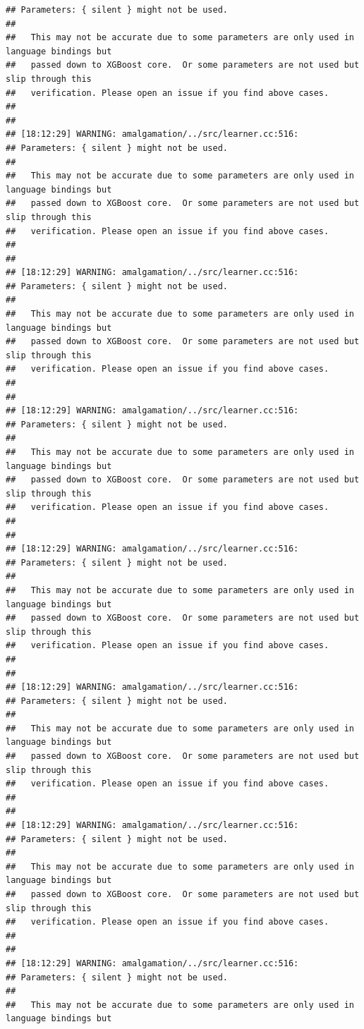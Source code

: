 \documentclass[AMS,STIX2COL]{WileyNJD-v2}\usepackage[]{graphicx}\usepackage[]{color}
\makeatletter
\newenvironment{kframe}{%
 \def\at@end@of@kframe{}%
 \ifinner\ifhmode%
  \def\at@end@of@kframe{\end{minipage}}%
  \begin{minipage}{\columnwidth}%
 \fi\fi%
 \def\FrameCommand##1{\hskip\@totalleftmargin \hskip-\fboxsep
 \colorbox{shadecolor}{##1}\hskip-\fboxsep
     \hskip-\linewidth \hskip-\@totalleftmargin \hskip\columnwidth}%
 \MakeFramed {\advance\hsize-\width
   \@totalleftmargin\z@ \linewidth\hsize
   \@setminipage}}%
 {\par\unskip\endMakeFramed%
 \at@end@of@kframe}
\newenvironment{knitrout}{}{} %
\makeatother
\begin{document}
\begin{knitrout}
\begin{kframe}
\begin{verbatim}
## Parameters: { silent } might not be used.
## 
##   This may not be accurate due to some parameters are only used in language bindings but
##   passed down to XGBoost core.  Or some parameters are not used but slip through this
##   verification. Please open an issue if you find above cases.
## 
## 
## [18:12:29] WARNING: amalgamation/../src/learner.cc:516: 
## Parameters: { silent } might not be used.
## 
##   This may not be accurate due to some parameters are only used in language bindings but
##   passed down to XGBoost core.  Or some parameters are not used but slip through this
##   verification. Please open an issue if you find above cases.
## 
## 
## [18:12:29] WARNING: amalgamation/../src/learner.cc:516: 
## Parameters: { silent } might not be used.
## 
##   This may not be accurate due to some parameters are only used in language bindings but
##   passed down to XGBoost core.  Or some parameters are not used but slip through this
##   verification. Please open an issue if you find above cases.
## 
## 
## [18:12:29] WARNING: amalgamation/../src/learner.cc:516: 
## Parameters: { silent } might not be used.
## 
##   This may not be accurate due to some parameters are only used in language bindings but
##   passed down to XGBoost core.  Or some parameters are not used but slip through this
##   verification. Please open an issue if you find above cases.
## 
## 
## [18:12:29] WARNING: amalgamation/../src/learner.cc:516: 
## Parameters: { silent } might not be used.
## 
##   This may not be accurate due to some parameters are only used in language bindings but
##   passed down to XGBoost core.  Or some parameters are not used but slip through this
##   verification. Please open an issue if you find above cases.
## 
## 
## [18:12:29] WARNING: amalgamation/../src/learner.cc:516: 
## Parameters: { silent } might not be used.
## 
##   This may not be accurate due to some parameters are only used in language bindings but
##   passed down to XGBoost core.  Or some parameters are not used but slip through this
##   verification. Please open an issue if you find above cases.
## 
## 
## [18:12:29] WARNING: amalgamation/../src/learner.cc:516: 
## Parameters: { silent } might not be used.
## 
##   This may not be accurate due to some parameters are only used in language bindings but
##   passed down to XGBoost core.  Or some parameters are not used but slip through this
##   verification. Please open an issue if you find above cases.
## 
## 
## [18:12:29] WARNING: amalgamation/../src/learner.cc:516: 
## Parameters: { silent } might not be used.
## 
##   This may not be accurate due to some parameters are only used in language bindings but

\end{verbatim}
\end{kframe}
\end{knitrout}
\end{document}
